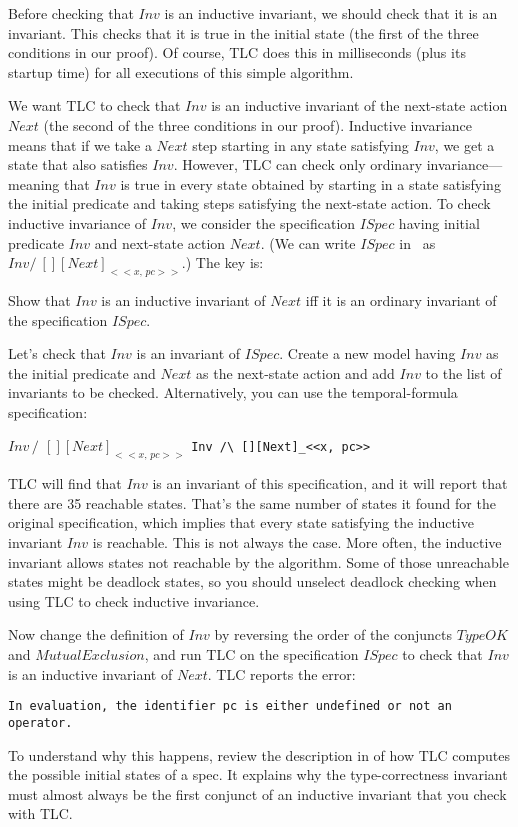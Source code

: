 \documentclass[fleqn,leqno]{article}
\begin{document}
Before checking that $Inv$ is an inductive invariant, we should check
that it is an invariant.  This checks that it is true in the initial
state (the first of the three conditions in our proof).  Of course,
TLC does this in milliseconds (plus its startup time) for all
executions of this simple algorithm.

We %
 want TLC to check that $Inv$ is an inductive invariant of the
next-state action $Next$ (the second of the three conditions in our
proof).  Inductive invariance means that if we take a $Next$ step
starting in any state satisfying $Inv$, we get a state that also
satisfies $Inv$.  However, TLC can check only ordinary
invariance---meaning that $Inv$ is true in every state obtained by
starting in a state satisfying the initial predicate and taking steps
satisfying the next-state action.  To check inductive invariance of
$Inv$, we consider the specification $ISpec$ having initial predicate
$Inv$ and next-state action $Next$.  (We can write $ISpec$ in
\tlaplus\ as
  $Inv /\ [][Next]_{<<x,\,pc>>}$.)  The key is:
\begin{question}
Show that $Inv$ is an inductive invariant of $Next$ iff it is an
ordinary invariant of the specification $ISpec$.
\end{question}
Let's check that $Inv$ is an invariant of $ISpec$.  Create a new model
having $Inv$ as the initial predicate and $Next$ as the next-state
action and add $Inv$ to the list of invariants to be checked.
Alternatively, you can use the temporal-formula specification:
\begin{display}
$Inv \, /\ \, [][Next]_{<<x,\,pc>>}$ 
\hfill
\verb|Inv /\ [][Next]_<<x, pc>>|
\end{display}
TLC will find that $Inv$ is an invariant of this specification, and it
will report that there are 35 reachable states.  That's the same
number of states it found for the original specification, which
implies that every state satisfying the inductive invariant $Inv$ is
reachable.  This is not always the case.  More often, the inductive
invariant allows states not reachable by the algorithm.  Some
of those unreachable states might be deadlock states, so you should 
unselect deadlock checking when using TLC to check
inductive invariance.

\medskip

Now change the definition of $Inv$ by reversing the order of the
conjuncts $TypeOK$ and ${MutualExclusion}$, and run TLC on the specification
$ISpec$ to check that $Inv$ is an inductive invariant of $Next$.
TLC reports the error:
\begin{display}
\tt In evaluation, the identifier pc is either 
undefined or not an operator.
\end{display}
To understand why this happens, review the description in
of how TLC computes the possible initial states of a spec.  It
explains why the type-correctness invariant must almost always be the
first conjunct of an inductive invariant that you check with TLC\@.
\end{document}
